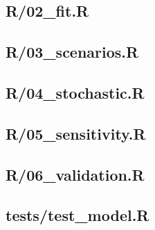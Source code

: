\documentclass[11pt,a4paper]{article}
\begin{document}
\subsection*{R/02\_fit.R}
\subsection*{R/03\_scenarios.R}
\subsection*{R/04\_stochastic.R}
\subsection*{R/05\_sensitivity.R}
\subsection*{R/06\_validation.R}
\subsection*{tests/test\_model.R}
\end{document}
